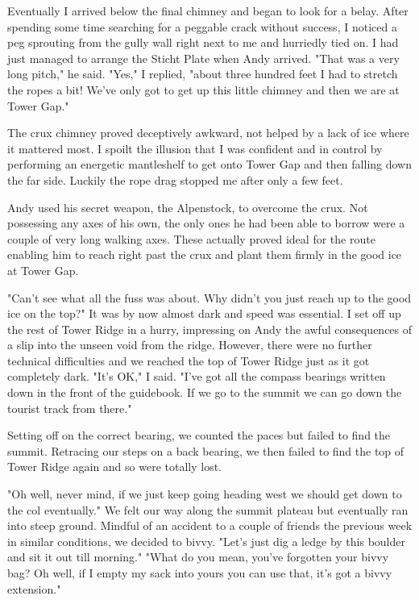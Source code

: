 \documentclass[a5paper,openany,font 10pt]{scrbook}
\begin{document}
Eventually I arrived below the final chimney and began to look
for a belay. After spending some time searching for a peggable crack
without success, I noticed a peg sprouting from the gully wall right
next to me and hurriedly tied on. I had just managed to arrange the
Sticht Plate when Andy arrived.  "That was a very long pitch," he
said.  "Yes," I replied, "about three hundred feet I had to stretch
the ropes a bit! We've only got to get up this little chimney and then
we are at Tower Gap."

The crux chimney proved deceptively awkward, not helped by a
lack of ice where it mattered most. I spoilt the illusion that I was
confident and in control by performing an energetic mantleshelf to get
onto Tower Gap and then falling down the far side. Luckily the rope
drag stopped me after only a few feet.

Andy used his secret weapon, the Alpenstock, to overcome the
crux. Not possessing any axes of his own, the only ones he had been
able to borrow were a couple of very long walking axes.  These
actually proved ideal for the route enabling him to reach right past
the crux and plant them firmly in the good ice at Tower Gap.

"Can't see what all the fuss was about. Why didn't you just
reach up to the good ice on the top?"  It was by now almost dark and
speed was essential. I set off up the rest of Tower Ridge in a hurry,
impressing on Andy the awful consequences of a slip into the unseen
void from the ridge.  However, there were no further technical
difficulties and we reached the top of Tower Ridge just as it got
completely dark.  "It's OK," I said. "I've got all the compass
bearings written down in the front of the guidebook. If we go to the
summit we can go down the tourist track from there."

Setting off on the correct bearing, we counted the paces but
failed to find the summit. Retracing our steps on a back bearing, we
then failed to find the top of Tower Ridge again and so were totally
lost.

"Oh well, never mind, if we just keep going heading west we
should get down to the col eventually."  We felt our way along the
summit plateau but eventually ran into steep ground. Mindful of an
accident to a couple of friends the previous week in similar
conditions, we decided to bivvy.  "Let's just dig a ledge by this
boulder and sit it out till morning."  "What do you mean, you've
forgotten your bivvy bag? Oh well, if I empty my sack into yours you
can use that, it's got a bivvy extension."
\end{document}
